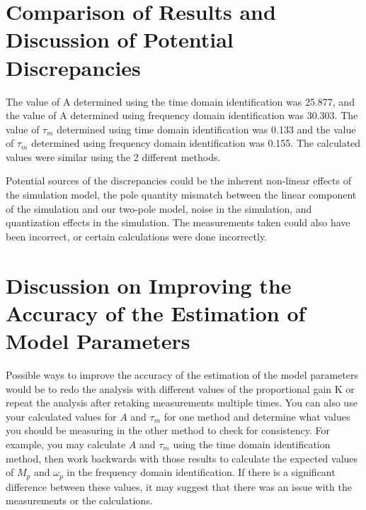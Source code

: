 \documentclass[12pt]{article}
\begin{document}
\section*{Comparison of Results and Discussion of Potential Discrepancies}
The value of A determined using the time domain identification was 25.877, and the value of A determined using frequency domain identification was 30.303. The value of $\tau_m$ determined using time domain identification was 0.133 and the value of $\tau_m$ determined using frequency domain identification was 0.155. The calculated values were similar using the 2 different methods. 

Potential sources of the discrepancies could be the inherent non-linear effects of the simulation model, the pole quantity mismatch between the linear component of the simulation and our two-pole model, noise in the simulation, and quantization effects in the simulation. The measurements taken could also have been incorrect, or certain calculations were done incorrectly.

\section*{Discussion on Improving the Accuracy of the Estimation of Model Parameters}
Possible ways to improve the accuracy of the estimation of the model parameters would be to redo the analysis with different values of the proportional gain K or repeat the analysis after retaking measurements multiple times. You can also use your calculated values for $A$ and $\tau_m$ for one method and determine what values you should be measuring in the other method to check for consistency. For example, you may calculate $A$ and $\tau_m$ using the time domain identification method, then work backwards with those results to calculate the expected values of $M_p$ and $\omega_p$ in the frequency domain identification. If there is a significant difference between these values, it may suggest that there was an issue with the measurements or the calculations.
\end{document}
